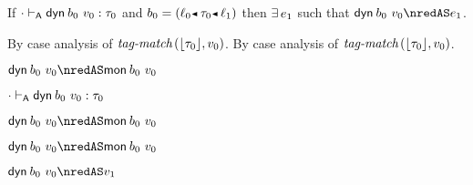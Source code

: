 \begin{lemma}\label{A-dyn-type-progress}
  If\/ ${\cdot} \vdash_{\mathsf{A}} \mathsf{dyn}^{}\,b_0~v_0 : \tau_0$
  and\/ $\sbnd_0 \eeq \obnd{\sowner_0}{\stype_0}{\sowner_1}$
  then\/ $\exists\,e_1$
  such that\/ $\edynb{\sbnd_0}{\svalue_0} \nredAS \sexpr_1$.
\end{lemma}{
  \newcommand{\shortproof}{By case analysis of $\fshallow{\tagof{\stype_0}}{\svalue_0}$.}
\begin{lamportproof*}
  \shortproof
\mainproof
  \shortproof

    \begin{pfproof}
      \qedstep
        \begin{pfproof}
          $\edynb{\sbnd_0}{\svalue_0} \nredAS \emon{\sbnd_0}{\svalue_0}$
        \end{pfproof}
    \end{pfproof}

    \begin{pfproof}
      \absurdstep
        \begin{pfproof}
          ${\cdot} \vdash_{\mathsf{A}} \mathsf{dyn}^{}\,b_0~v_0 : \tau_0$
        \end{pfproof}
    \end{pfproof}

    \begin{pfproof}
      \qedstep
        \begin{pfproof}
          $\edynb{\sbnd_0}{\svalue_0} \nredAS \emon{\sbnd_0}{\svalue_0}$
        \end{pfproof}
    \end{pfproof}

    \begin{pfproof}
      \qedstep
        \begin{pfproof}
          $\edynb{\sbnd_0}{\svalue_0} \nredAS \emon{\sbnd_0}{\svalue_0}$
        \end{pfproof}
    \end{pfproof}

    \begin{pfproof}
      \qedstep
        \begin{pfproof}
          $\edynb{\sbnd_0}{\svalue_0} \nredAS \svalue_1$
        \end{pfproof}
    \end{pfproof}


\end{lamportproof*}}
